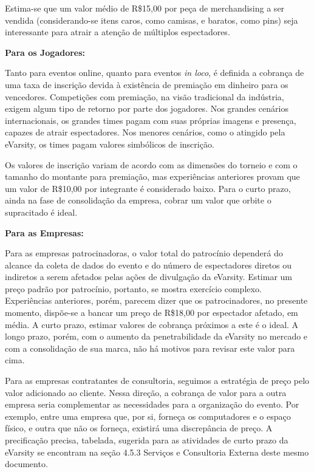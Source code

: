 \documentclass[a4paper, 12pt]{paper}
\begin{document}
Estima-se que um valor médio de R\$15,00 por peça de merchandising a ser vendida (considerando-se itens caros, como camisas, e baratos, como pins) seja interessante para atrair a atenção de múltiplos espectadores.

\textbf{Para os Jogadores:}

Tanto para eventos online, quanto para eventos \textit{in loco}, é definida a cobrança de uma taxa de inscrição devida à existência de premiação em dinheiro para os vencedores. Competições com premiação, na visão tradicional da indústria, exigem algum tipo de retorno por parte dos jogadores. Nos grandes cenários internacionais, os grandes times pagam com suas próprias imagens e presença, capazes de atrair espectadores. Nos menores cenários, como o atingido pela eVarsity, os times pagam valores simbólicos de inscrição.

Os valores de inscrição variam de acordo com as dimensões do torneio e com o tamanho do montante para premiação, mas experiências anteriores provam que um valor de R\$10,00 por integrante é considerado baixo. Para o curto prazo, ainda na fase de consolidação da empresa, cobrar um valor que orbite o supracitado é ideal.

\textbf{Para as Empresas:}

Para as empresas patrocinadoras, o valor total do patrocínio dependerá do alcance da coleta de dados do evento e do número de espectadores diretos ou indiretos a serem afetados pelas ações de divulgação da eVarsity. Estimar um preço padrão por patrocínio, portanto, se mostra exercício complexo. Experiências anteriores, porém, parecem dizer que os patrocinadores, no presente momento, dispõe-se a bancar um preço de R\$18,00 por espectador afetado, em média. A curto prazo, estimar valores de cobrança próximos a este é o ideal. A longo prazo, porém, com o aumento da penetrabilidade da eVarsity no mercado e com a consolidação de sua marca, não há motivos para revisar este valor para cima.

Para as empresas contratantes de consultoria, seguimos a estratégia de preço pelo valor adicionado ao cliente. Nessa direção, a cobrança de valor para a outra empresa seria complementar as necessidades para a organização do evento. Por exemplo, entre uma empresa que, por si, forneça os computadores e o espaço físico, e outra que não os forneça, existirá uma discrepância de preço. A precificação precisa, tabelada, sugerida para as atividades de curto prazo da eVarsity se encontram na seção 4.5.3 Serviços e Consultoria Externa deste mesmo documento.
\end{document}
